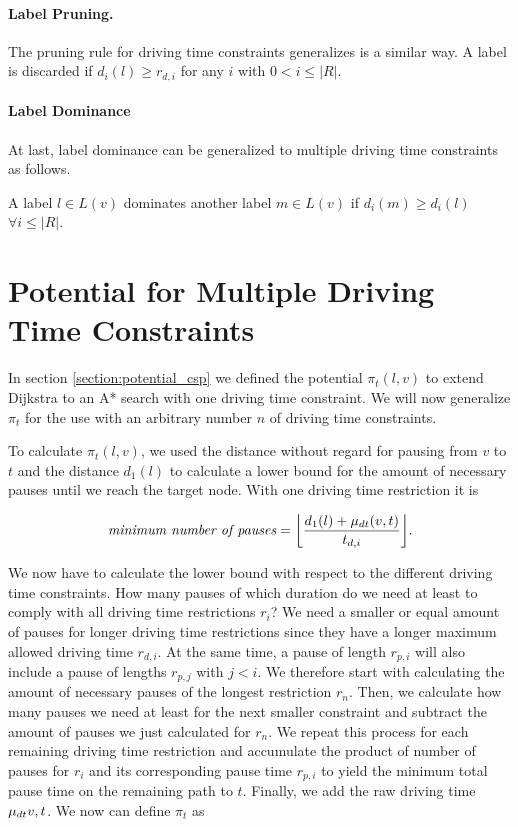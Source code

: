 \paragraph{Label Pruning.}
The pruning rule for driving time constraints generalizes is a similar way. A label is discarded if $d_i(l) \ge r_{d,i}$ for any $i$ with $0 < i \le |R|$.


\paragraph{Label Dominance}
At last, label dominance can be generalized to multiple driving time constraints as follows.
\begin{definition}
	A label $l \in L(v)$ dominates another label $m \in L(v)$ if $d_i(m) \ge d_i(l)$ $\forall i \le |R|$.
\end{definition}

\section{Potential for Multiple Driving Time Constraints}
In section \ref{section:potential_csp} we defined the potential $\pi_t(l,v)$ to extend Dijkstra to an A* search with one driving time constraint. We will now generalize $\pi_t$ for the use with an arbitrary number $n$ of driving time constraints.

To calculate $\pi_t(l,v)$, we used the distance without regard for pausing from $v$ to $t$ and the distance $d_1(l)$ to calculate a lower bound for the amount of necessary pauses until we reach the target node. With one driving time restriction it is

\[\textit{minimum number of pauses} = \floor*{ \frac{d_{1}(l) + \drivingtime(v,t)}{t_{d,i}} }.\]

We now have to calculate the lower bound with respect to the different driving time constraints. How many pauses of which duration do we need at least to comply with all driving time restrictions $r_i$? We need a smaller or equal amount of pauses for longer driving time restrictions since they have a longer maximum allowed driving time $r_{d,i}$. At the same time, a pause of length $r_{p,i}$ will also include a pause of lengths $r_{p,j}$ with $j < i$. We therefore start with calculating the amount of necessary pauses of the longest restriction $r_n$. Then, we calculate how many pauses we need at least for the next smaller constraint and subtract the amount of pauses we just calculated for $r_n$. We repeat this process for each remaining driving time restriction and accumulate the product of number of pauses for $r_i$ and its corresponding pause time $r_{p,i}$ to yield the minimum total pause time on the remaining path to $t$. Finally, we add the raw driving time $\mu_{dt}{v,t}$. We now can define $\pi_t$ as

